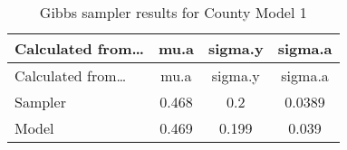 \documentclass[12pt,twoside]{reedthesis}
\begin{document}
  \begin{longtable}[]{@{}lccc@{}}
  \caption{Gibbs sampler results for County Model 1
  \label{tab:gibbs_1}}\tabularnewline
  \toprule
  \begin{minipage}[b]{0.26\columnwidth}\raggedright\strut
  Calculated from\ldots{}\strut
  \end{minipage} & \begin{minipage}[b]{0.10\columnwidth}\centering\strut
  mu.a\strut
  \end{minipage} & \begin{minipage}[b]{0.12\columnwidth}\centering\strut
  sigma.y\strut
  \end{minipage} & \begin{minipage}[b]{0.12\columnwidth}\centering\strut
  sigma.a\strut
  \end{minipage}\tabularnewline
  \midrule
  \endfirsthead
  \toprule
  \begin{minipage}[b]{0.26\columnwidth}\raggedright\strut
  Calculated from\ldots{}\strut
  \end{minipage} & \begin{minipage}[b]{0.10\columnwidth}\centering\strut
  mu.a\strut
  \end{minipage} & \begin{minipage}[b]{0.12\columnwidth}\centering\strut
  sigma.y\strut
  \end{minipage} & \begin{minipage}[b]{0.12\columnwidth}\centering\strut
  sigma.a\strut
  \end{minipage}\tabularnewline
  \midrule
  \endhead
  \begin{minipage}[t]{0.26\columnwidth}\raggedright\strut
  Sampler\strut
  \end{minipage} & \begin{minipage}[t]{0.10\columnwidth}\centering\strut
  0.468\strut
  \end{minipage} & \begin{minipage}[t]{0.12\columnwidth}\centering\strut
  0.2\strut
  \end{minipage} & \begin{minipage}[t]{0.12\columnwidth}\centering\strut
  0.0389\strut
  \end{minipage}\tabularnewline
  \begin{minipage}[t]{0.26\columnwidth}\raggedright\strut
  Model\strut
  \end{minipage} & \begin{minipage}[t]{0.10\columnwidth}\centering\strut
  0.469\strut
  \end{minipage} & \begin{minipage}[t]{0.12\columnwidth}\centering\strut
  0.199\strut
  \end{minipage} & \begin{minipage}[t]{0.12\columnwidth}\centering\strut
  0.039\strut
  \end{minipage}\tabularnewline
  \bottomrule
  \end{longtable}
  
\end{document}
